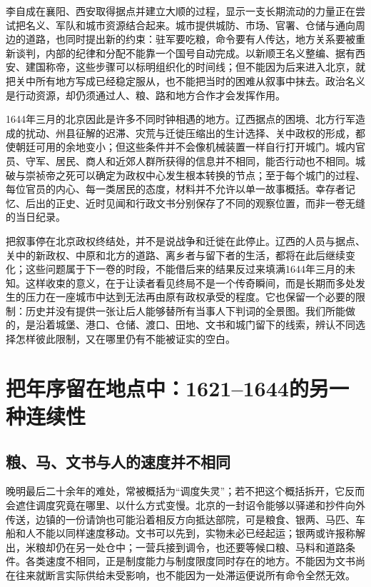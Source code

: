 李自成在襄阳、西安取得据点并建立大顺的过程，显示一支长期流动的力量正在尝试把名义、军队和城市资源结合起来。城市提供城防、市场、官署、仓储与通向周边的道路，也同时提出新的约束：驻军要吃粮，命令要有人传达，地方关系要被重新谈判，内部的纪律和分配不能靠一个国号自动完成。以新顺王名义整编、据有西安、建国称帝，这些步骤可以标明组织化的时间线；但不能因为后来进入北京，就把关中所有地方写成已经稳定服从，也不能把当时的困难从叙事中抹去。政治名义是行动资源，却仍须通过人、粮、路和地方合作才会发挥作用。

1644年三月的北京因此是许多不同时钟相遇的地方。辽西据点的困境、北方行军造成的扰动、州县征解的迟滞、灾荒与迁徙压缩出的生计选择、关中政权的形成，都使朝廷可用的余地变小；但这些条件并不会像机械装置一样自行打开城门。城内官员、守军、居民、商人和近郊人群所获得的信息并不相同，能否行动也不相同。城破与崇祯帝之死可以确定为政权中心发生根本转换的节点；至于每个城门的过程、每位官员的内心、每一类居民的态度，材料并不允许以单一故事概括。幸存者记忆、后出的正史、近时见闻和行政文书分别保存了不同的观察位置，而非一卷无缝的当日纪录。

把叙事停在北京政权终结处，并不是说战争和迁徙在此停止。辽西的人员与据点、关中的新政权、中原和北方的道路、离乡者与留下者的生活，都将在此后继续变化；这些问题属于下一卷的时段，不能借后来的结果反过来填满1644年三月的未知。这样收束的意义，在于让读者看见终局不是一个传奇瞬间，而是长期而多处发生的压力在一座城市中达到无法再由原有政权承受的程度。它也保留一个必要的限制：历史并没有提供一张让后人能够替所有当事人下判词的全景图。我们所能做的，是沿着城堡、港口、仓储、渡口、田地、文书和城门留下的线索，辨认不同选择怎样彼此限制，又在哪里仍有不能被证实的空白。

\section{把年序留在地点中：1621--1644的另一种连续性}

\subsection{粮、马、文书与人的速度并不相同}

晚明最后二十余年的难处，常被概括为“调度失灵”；若不把这个概括拆开，它反而会遮住调度究竟在哪里、以什么方式变慢。北京的一封诏令能够以驿递和抄件向外传送，边镇的一份请饷也可能沿着相反方向抵达部院，可是粮食、银两、马匹、车船和人不能以同样速度移动。文书可以先到，实物未必已经起运；银两或许报称解出，米粮却仍在另一处仓中；一营兵接到调令，也还要等候口粮、马料和道路条件。各类速度不相同，正是制度能力与制度限度同时存在的地方。不能因为文书尚在往来就断言实际供给未受影响，也不能因为一处滞运便说所有命令全然无效。

